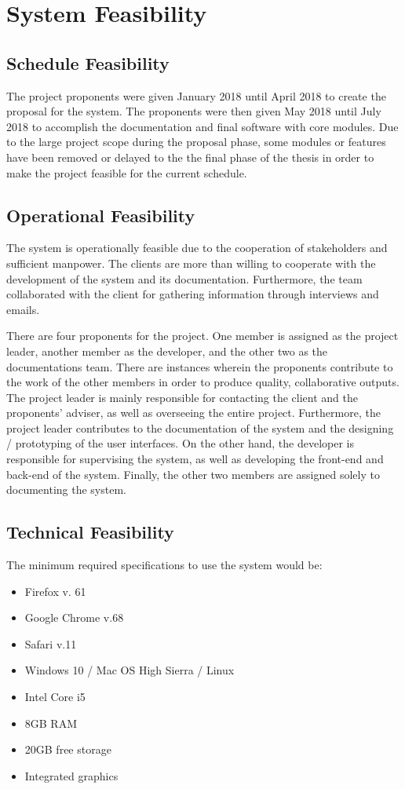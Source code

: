 \section{System Feasibility}

\subsection{Schedule Feasibility}
The project proponents were given January 2018 until April 2018 to create the proposal for the system. The proponents were then given May 2018 until July 2018 to accomplish the documentation and final software with core modules. Due to the large project scope during the proposal phase, some modules or features have been removed or delayed to the the final phase of the thesis in order to make the project feasible for the current schedule.

\subsection{Operational Feasibility}
The system is operationally feasible due to the cooperation of stakeholders and sufficient manpower. The clients are more than willing to cooperate with the development of the system and its documentation. Furthermore, the team collaborated with the client for gathering information through interviews and emails.

There are four proponents for the project. One member is assigned as the project leader, another member as the developer, and the other two as the documentations team. There are instances wherein the proponents contribute to the work of the other members in order to produce quality, collaborative outputs. The project leader is mainly responsible for contacting the client and the proponents' adviser, as well as overseeing the entire project. Furthermore, the project leader contributes to the documentation of the system and the designing / prototyping of the user interfaces. On the other hand, the developer is responsible for supervising the system, as well as developing the front-end and back-end of the system. Finally, the other two members are assigned solely to documenting the system.

\subsection{Technical Feasibility}
The minimum required specifications to use the system would be:
\begin{itemize}
    \item{Firefox v. 61}
    \item{Google Chrome v.68}
    \item{Safari v.11}
    \item{Windows 10 / Mac OS High Sierra / Linux}
    \item{Intel Core i5}
    \item{8GB RAM}
    \item{20GB free storage}
    \item{Integrated graphics}
\end{itemize}

